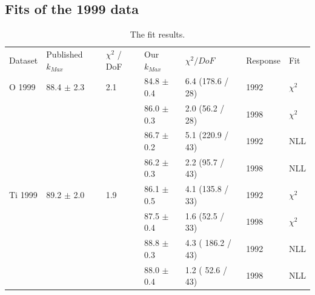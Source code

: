 \subsection { Fits of the 1999 data }

\begin{table}[H]
  \begin{center}
    \begin{tabular}{|l||l|l|l|l|l|l|}
      \hline
      Dataset & Published $k_{Max}$ & $\chi^2$ / DoF & Our $k_{Max}$ & $\chi^2 / DoF$  & Response & Fit \\
      \hhline{|=||=|=|=|=|=|=|}
       O 1999    & 88.4 $\pm$ 2.3 & 2.1 & 84.8 $\pm$ 0.4 & 6.4 (178.6 / 28) & 1992 & $\chi^2$ \\  
                 &                &     & 86.0 $\pm$ 0.3 & 2.0 (56.2 / 28)  & 1998 & $\chi^2$ \\  
                                                                            
                &                &     & 86.7 $\pm$ 0.2 & 5.1 (220.9 / 43) & 1992 & NLL\\
                &                &     & 86.2 $\pm$ 0.3 & 2.2 (95.7 / 43)  & 1998 & NLL\\
      \hline                           
       Ti 1999   & 89.2 $\pm$ 2.0 & 1.9 & 86.1 $\pm$ 0.5 & 4.1 (135.8 / 33) & 1992 & $\chi^2$ \\  
                 &                &     & 87.5 $\pm$ 0.4 & 1.6 (52.5 / 33)  & 1998 & $\chi^2$ \\  
                                                                            
                &                &     & 88.8 $\pm$ 0.3 & 4.3 ( 186.2 / 43) & 1992 & NLL \\
                &                &     & 88.0 $\pm$ 0.4 & 1.2 ( 52.6 / 43) & 1998 & NLL \\
      \hline                           
    \end{tabular}
  \end{center}
  \caption{The fit results.}
  \label{table:fits1999}
\end{table}

